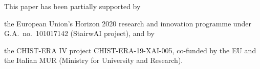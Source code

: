 \documentclass[
]{ceurart}
\begin{document}
\begin{acknowledgments}
	This paper has been partially supported by
	\begin{inlinelist}
		\item the European Union's Horizon 2020 research and innovation programme under G.A.\ no.\ 101017142 (StairwAI project), and by
		\item the CHIST-ERA IV project CHIST-ERA-19-XAI-005, co-funded by the EU and the Italian MUR (Ministry for University and Research).
	\end{inlinelist}
\end{acknowledgments}


\end{document}

